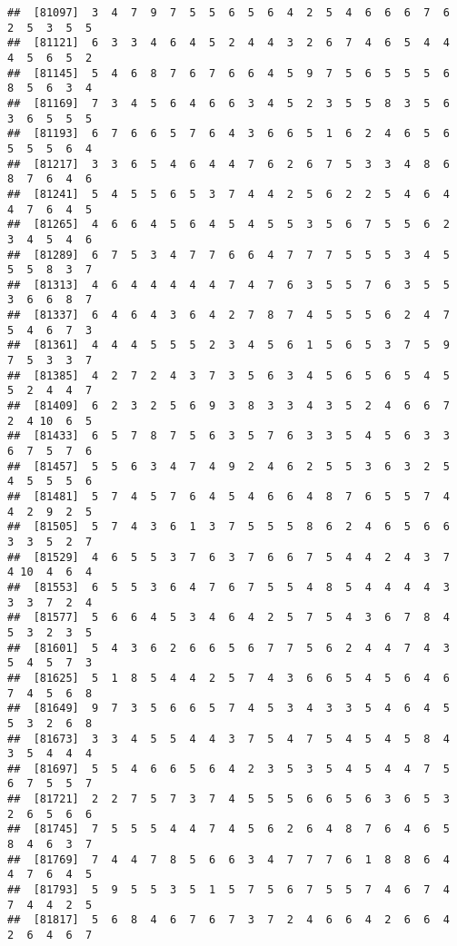 \documentclass[
]{book}
\begin{document}
\begin{verbatim}
##  [81097]  3  4  7  9  7  5  5  6  5  6  4  2  5  4  6  6  6  7  6  2  5  3  5  5
##  [81121]  6  3  3  4  6  4  5  2  4  4  3  2  6  7  4  6  5  4  4  4  5  6  5  2
##  [81145]  5  4  6  8  7  6  7  6  6  4  5  9  7  5  6  5  5  5  6  8  5  6  3  4
##  [81169]  7  3  4  5  6  4  6  6  3  4  5  2  3  5  5  8  3  5  6  3  6  5  5  5
##  [81193]  6  7  6  6  5  7  6  4  3  6  6  5  1  6  2  4  6  5  6  5  5  5  6  4
##  [81217]  3  3  6  5  4  6  4  4  7  6  2  6  7  5  3  3  4  8  6  8  7  6  4  6
##  [81241]  5  4  5  5  6  5  3  7  4  4  2  5  6  2  2  5  4  6  4  4  7  6  4  5
##  [81265]  4  6  6  4  5  6  4  5  4  5  5  3  5  6  7  5  5  6  2  3  4  5  4  6
##  [81289]  6  7  5  3  4  7  7  6  6  4  7  7  7  5  5  5  3  4  5  5  5  8  3  7
##  [81313]  4  6  4  4  4  4  4  7  4  7  6  3  5  5  7  6  3  5  5  3  6  6  8  7
##  [81337]  6  4  6  4  3  6  4  2  7  8  7  4  5  5  5  6  2  4  7  5  4  6  7  3
##  [81361]  4  4  4  5  5  5  2  3  4  5  6  1  5  6  5  3  7  5  9  7  5  3  3  7
##  [81385]  4  2  7  2  4  3  7  3  5  6  3  4  5  6  5  6  5  4  5  5  2  4  4  7
##  [81409]  6  2  3  2  5  6  9  3  8  3  3  4  3  5  2  4  6  6  7  2  4 10  6  5
##  [81433]  6  5  7  8  7  5  6  3  5  7  6  3  3  5  4  5  6  3  3  6  7  5  7  6
##  [81457]  5  5  6  3  4  7  4  9  2  4  6  2  5  5  3  6  3  2  5  4  5  5  5  6
##  [81481]  5  7  4  5  7  6  4  5  4  6  6  4  8  7  6  5  5  7  4  4  2  9  2  5
##  [81505]  5  7  4  3  6  1  3  7  5  5  5  8  6  2  4  6  5  6  6  3  3  5  2  7
##  [81529]  4  6  5  5  3  7  6  3  7  6  6  7  5  4  4  2  4  3  7  4 10  4  6  4
##  [81553]  6  5  5  3  6  4  7  6  7  5  5  4  8  5  4  4  4  4  3  3  3  7  2  4
##  [81577]  5  6  6  4  5  3  4  6  4  2  5  7  5  4  3  6  7  8  4  5  3  2  3  5
##  [81601]  5  4  3  6  2  6  6  5  6  7  7  5  6  2  4  4  7  4  3  5  4  5  7  3
##  [81625]  5  1  8  5  4  4  2  5  7  4  3  6  6  5  4  5  6  4  6  7  4  5  6  8
##  [81649]  9  7  3  5  6  6  5  7  4  5  3  4  3  3  5  4  6  4  5  5  3  2  6  8
##  [81673]  3  3  4  5  5  4  4  3  7  5  4  7  5  4  5  4  5  8  4  3  5  4  4  4
##  [81697]  5  5  4  6  6  5  6  4  2  3  5  3  5  4  5  4  4  7  5  6  7  5  5  7
##  [81721]  2  2  7  5  7  3  7  4  5  5  5  6  6  5  6  3  6  5  3  2  6  5  6  6
##  [81745]  7  5  5  5  4  4  7  4  5  6  2  6  4  8  7  6  4  6  5  8  4  6  3  7
##  [81769]  7  4  4  7  8  5  6  6  3  4  7  7  7  6  1  8  8  6  4  4  7  6  4  5
##  [81793]  5  9  5  5  3  5  1  5  7  5  6  7  5  5  7  4  6  7  4  7  4  4  2  5
##  [81817]  5  6  8  4  6  7  6  7  3  7  2  4  6  6  4  2  6  6  4  2  6  4  6  7

\end{verbatim}
\end{document}
